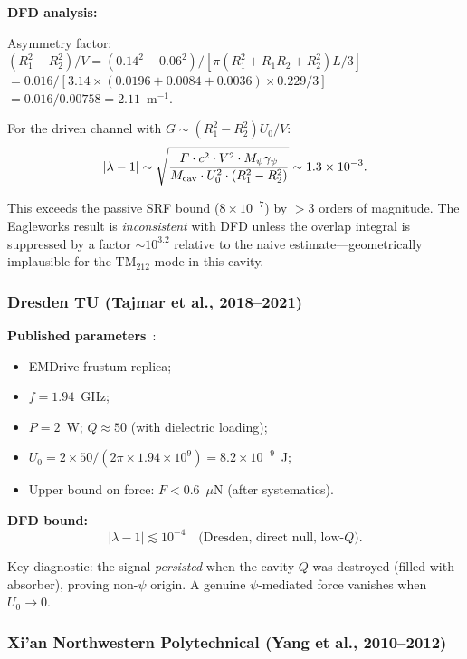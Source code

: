 \documentclass[12pt,aps,prd,twocolumn,superscriptaddress,nofootinbib]{revtex4-2}
\newcommand{\gpsi}{\gamma_\psi}
\newcommand{\Mpsi}{M_\psi}
\begin{document}
\textbf{DFD analysis:}

Asymmetry factor: $(R_1^2-R_2^2)/V = (0.14^2-0.06^2)/
[\pi(R_1^2+R_1R_2+R_2^2)L/3]$
$= 0.016/[3.14\times(0.0196+0.0084+0.0036)\times0.229/3]$
$= 0.016/0.00758 = 2.11$~m$^{-1}$.

For the driven channel with $G \sim (R_1^2-R_2^2)U_0/V$:
\begin{equation}
|\lambda-1| \sim \sqrt{\frac{F\cdot c^2\cdot V^2\cdot\Mpsi\gpsi}
{M_{\rm cav}\cdot U_0^2\cdot(R_1^2-R_2^2)}}
\sim 1.3\times10^{-3}.
\label{eq:eagleworks_lambda}
\end{equation}

This exceeds the passive SRF bound ($8\times10^{-7}$) by
$>3$ orders of magnitude.  The Eagleworks result is \emph{inconsistent}
with DFD unless the overlap integral is suppressed by a factor
$\sim10^{3.2}$ relative to the naive estimate---geometrically
implausible for the TM$_{212}$ mode in this cavity.

\subsubsection{Dresden TU (Tajmar et al., 2018--2021)}
\label{sec:dresden}

\textbf{Published parameters}~\cite{Tajmar2021}:
\begin{itemize}[noitemsep]
\item EMDrive frustum replica;
\item $f = 1.94$~GHz;
\item $P = 2$~W; $Q \approx 50$ (with dielectric loading);
\item $U_0 = 2\times50/(2\pi\times1.94\times10^9) = 8.2\times10^{-9}$~J;
\item Upper bound on force: $F < 0.6$~$\mu$N (after systematics).
\end{itemize}

\textbf{DFD bound:}
\begin{equation}
|\lambda-1| \lesssim 10^{-4}
\quad\text{(Dresden, direct null, low-$Q$)}.
\label{eq:dresden_result}
\end{equation}

Key diagnostic: the signal \emph{persisted} when the cavity $Q$
was destroyed (filled with absorber), proving non-$\psi$ origin.
A genuine $\psi$-mediated force vanishes when $U_0 \to 0$.

\subsubsection{Xi'an Northwestern Polytechnical (Yang et al., 2010--2012)}
\label{sec:xian}
\end{document}

